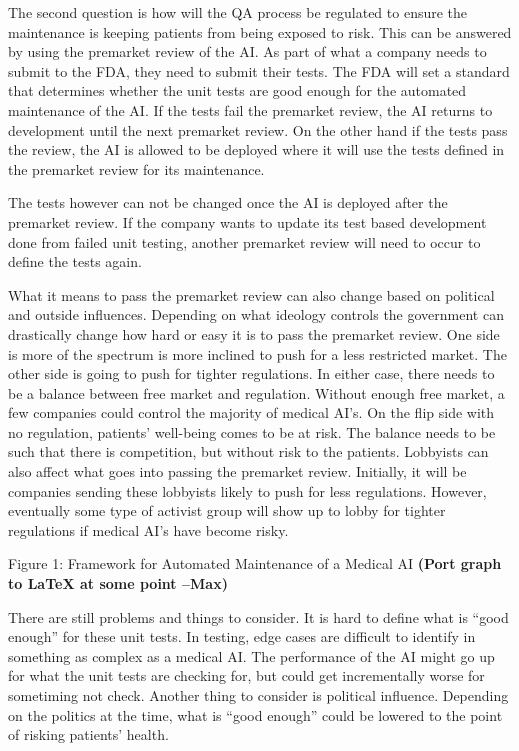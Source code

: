 \documentclass[]{article}
\begin{document}
		The second question is how will the QA process be regulated to ensure the maintenance is keeping patients from being exposed to risk. This can be answered by using the premarket review of the AI. As part of what a company needs to submit to the FDA, they need to submit their tests. The FDA will set a standard that determines whether the unit tests are good enough for the automated maintenance of the AI. If the tests fail the premarket review, the AI returns to development until the next premarket review. On the other hand if the tests pass the review, the AI is allowed to be deployed where it will use the tests defined in the premarket review for its maintenance.

		The tests however can not be changed once the AI is deployed after the premarket review. If the company wants to update its test based development done from failed unit testing, another premarket review will need to occur to define the tests again.

		What it means to pass the premarket review can also change based on political and outside influences. Depending on what ideology controls the government can drastically change how hard or easy it is to pass the premarket review. One side is more of the spectrum is more inclined to push for a less restricted market. The other side is going to push for tighter regulations. In either case, there needs to be a balance between free market and regulation. Without enough free market, a few companies could control the majority of medical AI’s. On the flip side with no regulation, patients’ well-being comes to be at risk. The balance needs to be such that there is competition, but without risk to the patients. Lobbyists can also affect what goes into passing the premarket review. Initially, it will be companies sending these lobbyists likely to push for less regulations. However, eventually some type of activist group will show up to lobby for tighter regulations if medical AI’s have become risky.

		Figure 1: Framework for Automated Maintenance of a Medical AI \textbf{(Port graph to LaTeX at some point --Max)}

		There are still problems and things to consider. It is hard to define what is “good enough” for these unit tests. In testing, edge cases are difficult to identify in something as complex as a medical AI. The performance of the AI might go up for what the unit tests are checking for, but could get incrementally worse for sometiming not check. Another thing to consider is political influence. Depending on the politics at the time, what is “good enough” could be lowered to the point of risking patients’ health.
	
\end{document}
